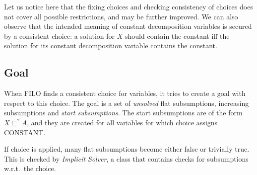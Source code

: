 \documentclass{article}
\newcommand{\wrt}{w.r.t.\ }
\begin{document}
Let us notice here that the fixing choices and checking consistency of choices does not cover all
possible restrictions, and may be further improved.
We can also observe that the intended meaning of constant decomposition variables is secured by 
a consistent choice: a solution for $X$ should contain the constant iff the solution for its constant decomposition variable contains the constant.


\subsection{Goal}
When FILO finds a consistent choice for variables, it tries to create a goal with respect to this choice.
The goal is a set of \emph{unsolved} flat subsumptions, increasing subsumptions and \emph{start subsumptions}.
The start subsumptions are of the form $X \sqsubseteq^? A$, and they are created for all variables for which
choice assigns CONSTANT.

If choice is applied, many flat subsumptions become either false or trivially true.
This is checked by \emph{Implicit Solver}, a class that contains checks for subsumptions \wrt the choice.
\end{document}
